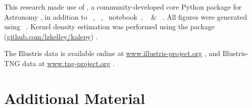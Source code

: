     This research made use of \astropy, a community-developed core Python package for Astronomy \citep{astropy2013}, in addition to \scipy~\citep{scipy}, \ipython~\citep{ipython}, \jupyter~notebook~\citep{jupyter}, \numpy~\citep{numpy2011} \& \sympy~\citep{sympy2017}.  All figures were generated using \matplotlib~\citep{matplotlib2007}.  Kernel density estimation was performed using the \kalepy{} package (\href{https://github.com/lzkelley/kalepy}{github.com/lzkelley/kalepy}) \citep{kalepy2020}.

    The Illustris data is available online at \href{https://www.illustris-project.org/}{www.illustris-project.org} \citep{Nelson+2015}, and Illustris-TNG data at \href{https://www.tng-project.org/}{www.tng-project.org} \citep{Nelson+2019}.



\let\oldUrl\url
\renewcommand{\url}[1]{\href{#1}{Link}}

\quad{}



\onecolumn
\clearpage



\appendix

    \section{Additional Material}
        \label{sec:app}

